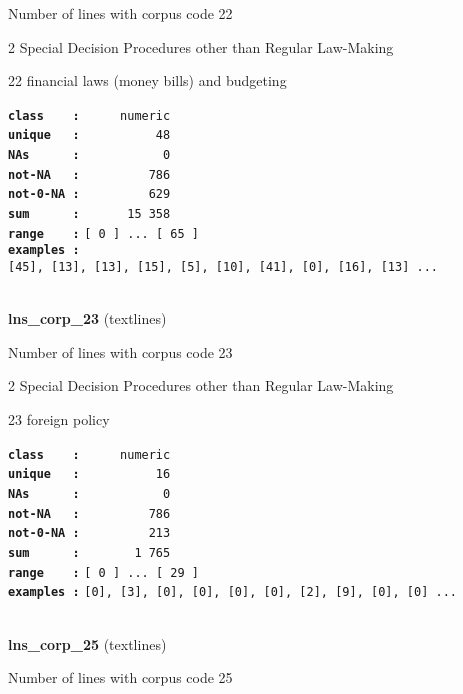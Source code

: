 \documentclass[]{article}
\begin{document}
Number of lines with corpus code 22

2 Special Decision Procedures other than Regular Law-Making

22 financial laws (money bills) and budgeting

\textbf{\texttt{class\ \ \ \ :}} \texttt{~~~~~numeric}\\
\textbf{\texttt{unique\ \ \ :}} \texttt{~~~~~~~~~~48}\\
\textbf{\texttt{NAs\ \ \ \ \ \ :}} \texttt{~~~~~~~~~~~0}\\
\textbf{\texttt{not-NA\ \ \ :}} \texttt{~~~~~~~~~786}\\
\textbf{\texttt{not-0-NA\ :}} \texttt{~~~~~~~~~629}\\
\textbf{\texttt{sum\ \ \ \ \ \ :}} \texttt{~~~~~~15~358}\\
\textbf{\texttt{range\ \ \ \ :}}
\texttt{{[}\ 0\ {]}\ ...\ {[}\ 65\ {]}}\\
\textbf{\texttt{examples\ :}}
\texttt{{[}45{]},\ {[}13{]},\ {[}13{]},\ {[}15{]},\ {[}5{]},\ {[}10{]},\ {[}41{]},\ {[}0{]},\ {[}16{]},\ {[}13{]}\ ...}\\

~

\textbf{lns\_corp\_23} (textlines)

Number of lines with corpus code 23

2 Special Decision Procedures other than Regular Law-Making

23 foreign policy

\textbf{\texttt{class\ \ \ \ :}} \texttt{~~~~~numeric}\\
\textbf{\texttt{unique\ \ \ :}} \texttt{~~~~~~~~~~16}\\
\textbf{\texttt{NAs\ \ \ \ \ \ :}} \texttt{~~~~~~~~~~~0}\\
\textbf{\texttt{not-NA\ \ \ :}} \texttt{~~~~~~~~~786}\\
\textbf{\texttt{not-0-NA\ :}} \texttt{~~~~~~~~~213}\\
\textbf{\texttt{sum\ \ \ \ \ \ :}} \texttt{~~~~~~~1~765}\\
\textbf{\texttt{range\ \ \ \ :}}
\texttt{{[}\ 0\ {]}\ ...\ {[}\ 29\ {]}}\\
\textbf{\texttt{examples\ :}}
\texttt{{[}0{]},\ {[}3{]},\ {[}0{]},\ {[}0{]},\ {[}0{]},\ {[}0{]},\ {[}2{]},\ {[}9{]},\ {[}0{]},\ {[}0{]}\ ...}\\

~

\textbf{lns\_corp\_25} (textlines)

Number of lines with corpus code 25
\end{document}
